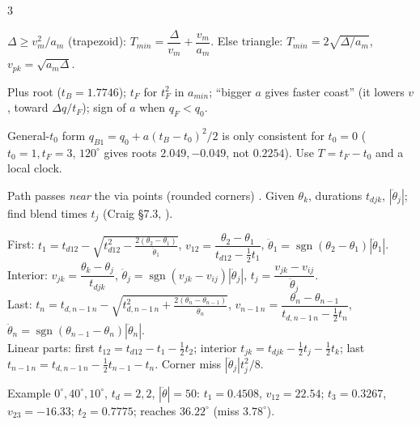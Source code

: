 \begin{multicols}{3}
\begin{fbx}
$\Delta\ge v_m^2/a_m$ (trapezoid): $T_{min}=\dfrac{\Delta}{v_m}+\dfrac{v_m}{a_m}$. Else triangle: $T_{min}=2\sqrt{\Delta/a_m}$, $v_{pk}=\sqrt{a_m\Delta}$.
\end{fbx}
\begin{trap}
Plus root ($t_B=1.7746$); $t_F$ for $t_F^2$ in $a_{min}$; ``bigger $a$ gives faster coast'' (it lowers $v$, toward $\Delta q/t_F$); sign of $a$ when $q_F<q_0$.
\end{trap}
\begin{slideerr}[pp.\,33--34]
General-$t_0$ form $q_{B1}=q_0+a(t_B-t_0)^2/2$ is only consistent for $t_0=0$ ($t_0=1,t_F=3$, $120^\circ$ gives roots $2.049,-0.049$, not $0.2254$). Use $T=t_F-t_0$ and a local clock.
\end{slideerr}

Path passes \emph{near} the via points (rounded corners) . Given $\theta_k$, durations $t_{djk}$, $|\ddot\theta_j|$; find blend times $t_j$ (Craig \S7.3, \added).
\begin{fbx}
First: $t_1=t_{d12}-\sqrt{t_{d12}^2-\frac{2(\theta_2-\theta_1)}{\ddot\theta_1}}$, $v_{12}=\dfrac{\theta_2-\theta_1}{t_{d12}-\frac12t_1}$, $\ddot\theta_1=\operatorname{sgn}(\theta_2{-}\theta_1)|\ddot\theta_1|$.\\
Interior: $v_{jk}=\dfrac{\theta_k-\theta_j}{t_{djk}}$, $\ddot\theta_j=\operatorname{sgn}(v_{jk}-v_{ij})|\ddot\theta_j|$, $t_j=\dfrac{v_{jk}-v_{ij}}{\ddot\theta_j}$.\\
Last: $t_n=t_{d,n-1\,n}-\sqrt{t_{d,n-1\,n}^2+\frac{2(\theta_n-\theta_{n-1})}{\ddot\theta_n}}$, $v_{n-1\,n}=\dfrac{\theta_n-\theta_{n-1}}{t_{d,n-1\,n}-\frac12t_n}$, $\ddot\theta_n=\operatorname{sgn}(\theta_{n-1}{-}\theta_n)|\ddot\theta_n|$.\\
Linear parts: first $t_{12}=t_{d12}-t_1-\frac12t_2$; interior $t_{jk}=t_{djk}-\frac12t_j-\frac12t_k$; last $t_{n-1\,n}=t_{d,n-1\,n}-\frac12t_{n-1}-t_n$. Corner miss $|\ddot\theta_j|t_j^2/8$.
\end{fbx}
Example $0^\circ,40^\circ,10^\circ$, $t_d=2,2$, $|\ddot\theta|=50$: $t_1=0.4508$, $v_{12}=22.54$; $t_3=0.3267$, $v_{23}=-16.33$; $t_2=0.7775$; reaches $36.22^\circ$ (miss $3.78^\circ$). \chk


\end{multicols}
